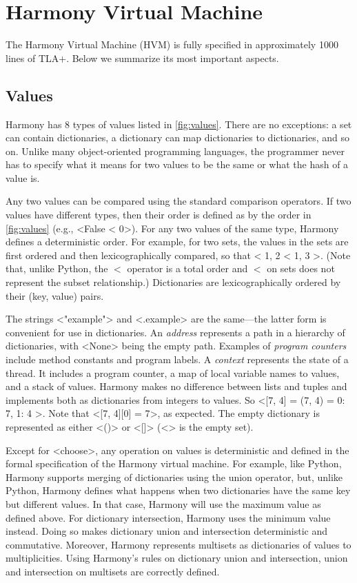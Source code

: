 \documentclass[twocolumn]{article}
\begin{document}
\section{Harmony Virtual Machine}

The Harmony Virtual Machine (HVM) is fully specified in approximately
1000 lines of TLA+.
Below we summarize its most important aspects.

\subsection{Values}

Harmony has 8 types of values listed in \autoref{fig:values}.
There are no exceptions: a set can contain dictionaries, a dictionary
can map dictionaries to dictionaries, and so on.  Unlike many
object-oriented programming languages, the programmer never
has to specify what it means for two values to be the same or what the
hash of a value is.

Any two values can be compared using the standard comparison operators.
If two values have different types, then their order is defined as by
the order in \autoref{fig:values} (e.g., <{False < 0}>).
For any two values of the same type, Harmony defines a deterministic order.
For example, for two sets, the values in the sets are first ordered and
then lexicographically compared, so that <{{ 1, 2 } < { 1, 3 }}>.
(Note that, unlike Python, the $<$ operator is a total order and
$<$ on sets does not represent the subset relationship.)
Dictionaries are lexicographically ordered by their (key, value) pairs.

The strings <{"example"}> and <{.example}> are the same---the latter
form is convenient for use in dictionaries.
An \emph{address} represents a path in a hierarchy of dictionaries, with
<{None}> being the empty path.
Examples of \emph{program counters} include method constants and program labels.
A \emph{context} represents the state of a thread.  It includes a program
counter, a map of local variable names to values, and a stack of values.
Harmony makes no difference between lists and tuples and implements
both as dictionaries from integers to values.
So <{[7, 4] = (7, 4) = { 0: 7, 1: 4 }}>.
Note that <{[7, 4][0] = 7}>, as expected.
The empty dictionary is represented as either <{()}> or <{[]}>
(<{{}}> is the empty set).

Except for <{choose}>, any operation on values is deterministic and
defined in the formal specification of the Harmony virtual machine.
For example, like Python, Harmony supports merging of dictionaries
using the union operator, but, unlike Python, Harmony defines
what happens when two dictionaries have the same key but different values.
In that case, Harmony will use the maximum value as defined above.
For dictionary  intersection, Harmony uses the minimum value instead.
Doing so makes dictionary union and intersection deterministic and
commutative.  Moreover, Harmony represents multisets as dictionaries
of values to multiplicities.  Using Harmony's rules on dictionary union
and intersection, union and intersection on multisets are correctly
defined.
\end{document}
